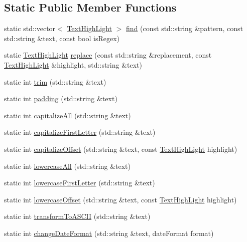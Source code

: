 \subsection*{Static Public Member Functions}
\begin{DoxyCompactItemize}
\item 
static std\+::vector$<$ \hyperlink{class_text_high_light}{Text\+High\+Light} $>$ \hyperlink{class_string_manipulator_afc935f4ef36a3683bf4a0b7db2b354db}{find} (const std\+::string \&pattern, const std\+::string \&text, const bool is\+Regex)
\item 
static \hyperlink{class_text_high_light}{Text\+High\+Light} \hyperlink{class_string_manipulator_ae84413e9862b7e46f381ad43793f1117}{replace} (const std\+::string \&replacement, const \hyperlink{class_text_high_light}{Text\+High\+Light} \&highlight, std\+::string \&text)
\item 
static int \hyperlink{class_string_manipulator_a37e0bceb7f3f726912f3750e2910c30d}{trim} (std\+::string \&text)
\item 
static int \hyperlink{class_string_manipulator_a03ee428eed1a526be0382c0c7ae297dd}{padding} (std\+::string \&text)
\item 
static int \hyperlink{class_string_manipulator_a5c3623c8798af0aa7230f972e8be6032}{capitalize\+All} (std\+::string \&text)
\item 
static int \hyperlink{class_string_manipulator_af0c3de234425bcbdeba6ffb32fb9486b}{capitalize\+First\+Letter} (std\+::string \&text)
\item 
static int \hyperlink{class_string_manipulator_ab12616f5d40ce39ba3d26f2af39fc8d9}{capitalize\+Offset} (std\+::string \&text, const \hyperlink{class_text_high_light}{Text\+High\+Light} highlight)
\item 
static int \hyperlink{class_string_manipulator_af7e1662a6c1a1210e58f521db6a132cd}{lowercase\+All} (std\+::string \&text)
\item 
static int \hyperlink{class_string_manipulator_ad94710fa3a5e1a3c3ff7284ecb9c6f33}{lowercase\+First\+Letter} (std\+::string \&text)
\item 
static int \hyperlink{class_string_manipulator_ae02eefd357a9e6442021f9f49a42d959}{lowercase\+Offset} (std\+::string \&text, const \hyperlink{class_text_high_light}{Text\+High\+Light} highlight)
\item 
static int \hyperlink{class_string_manipulator_ada98fef8f4eaac2525bb583c654e3c9d}{transform\+To\+A\+S\+C\+II} (std\+::string \&text)
\item 
static int \hyperlink{class_string_manipulator_a88bd80f0412cc80d18a1acbc9b838489}{change\+Date\+Format} (std\+::string \&text, date\+Format format)

\end{DoxyCompactItemize}
